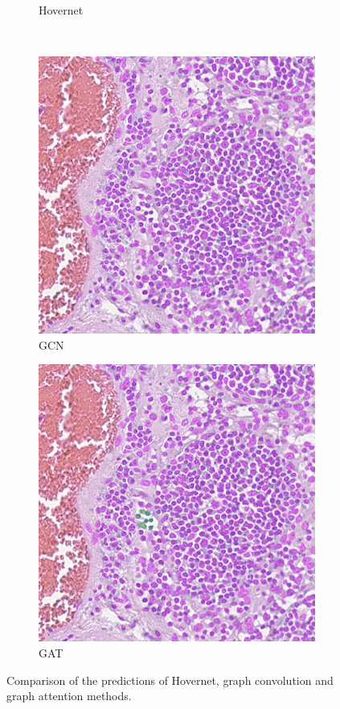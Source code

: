 \begin{figure}[H]
\begin{subfigure}[b]{0.45\textwidth}
    \caption{Hovernet}
    \label{fig:consep-hov1}
  \end{subfigure}
  \\
  \begin{subfigure}[b]{0.45\textwidth}
    \includegraphics[width=\textwidth]{imgs/qual/consep/gcn-full1.png}
    \caption{GCN}
    \label{fig:consep-gcn1}
  \end{subfigure}
  \hfill
  \begin{subfigure}[b]{0.45\textwidth}
    \includegraphics[width=\textwidth]{imgs/qual/consep/gat-full1.png}
    \caption{GAT}
    \label{fig:consep-gat1}
  \end{subfigure}
  \caption{Comparison of the predictions of Hovernet, graph convolution and graph attention methods.}
  \label{fig:consep-qual1}
\end{figure}

